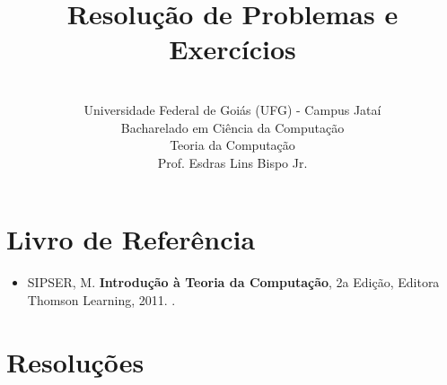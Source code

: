 \documentclass[12pt,a4paper,oneside]{article}
\author{\\Universidade Federal de Goiás (UFG) - Campus Jataí\\Bacharelado em Ciência da Computação \\Teoria da Computação \\Prof. Esdras Lins Bispo Jr.}
\date{}
\title{\sc \huge Resolução de Problemas e Exercícios}
\begin{document}
\maketitle

\section{Livro de Referência}
	\begin{itemize}
		\item SIPSER, M. {\bf Introdução à Teoria da Computação}, 2a Edição, Editora Thomson Learning, 2011. \color{blue}{\bf Código Bib.: [004 SIP/int]}.
	\end{itemize}
	
\section{Resoluções}
\end{document}
